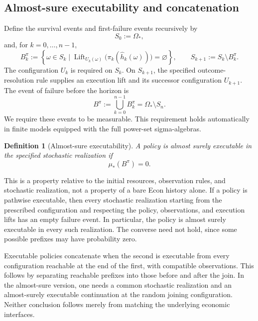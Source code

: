 \documentclass[11pt,a4paper]{article}
\newtheorem{definition}{Definition}[section]
\begin{document}
\subsection{Almost-sure executability and concatenation}
\label{sec:AlmostSureExecutability}

Define the survival events and first-failure events recursively by
\[
  S_0:=\Omega_*,
\]
and, for $k=0,\ldots,n-1$,
\[
  B_k^\pi
  :=
  \left\{
    \omega\in S_k
\mid
    \operatorname{Lift}_{U_k(\omega)}
    \bigl(\pi_k(\widehat h_k(\omega))\bigr)
    =\varnothing
  \right\},
  \qquad
  S_{k+1}:=S_k\setminus B_k^\pi.
\]
The configuration $U_k$ is required on $S_k$.
On $S_{k+1}$, the specified outcome-resolution rule supplies
an execution lift and its successor configuration $U_{k+1}$.
The event of failure before the horizon is
\[
    B^\pi:=\bigcup_{k=0}^{n-1}B_k^\pi
          =\Omega_*\setminus S_n.
\]
We require these events to be measurable.
This requirement holds automatically in finite models equipped
with the full power-set sigma-algebras.



\begin{definition}[Almost-sure executability]
A policy is \emph{almost surely executable} in the specified stochastic
realization if
\[
    \mu_*(B^\pi)=0.
\]
\end{definition}

This is a property relative to the initial resources, observation rules,
and stochastic realization, not a property of a bare Econ history alone.
%
If a policy is pathwise executable, 
then every stochastic realization starting from the prescribed configuration 
and respecting the policy, observations, and execution lifts has an empty failure event. 
In particular, the policy is almost surely executable in every such realization.
%
The converse need not hold, since some possible prefixes may have probability zero.

Executable policies concatenate when the second is executable from every
configuration reachable at the end of the first, with compatible
observations. This follows by separating reachable prefixes into those
before and after the join. In the almost-sure version, one needs a common
stochastic realization and an almost-surely executable continuation at the
random joining configuration. Neither conclusion follows merely from
matching the underlying economic interfaces.
\end{document}
